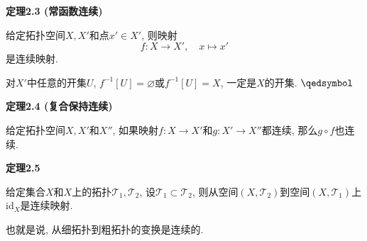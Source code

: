 \hypertarget{sec:定理2.3}{}
\noindent\textbf{定理2.3 (常函数连续)}

给定拓扑空间$X,X'$和点$x'\in X'$, 则映射
\[
    f:X\to X',\quad x\mapsto x'
\]
是连续映射.


对$X'$中任意的开集$U$, $f^{-1}[U]=\varnothing$或$f^{-1}[U]=X$, 一定是$X$的开集.
\hfill $\qedsymbol$

\vspace{10pt}

\hypertarget{sec:定理2.4}{}
\noindent\textbf{定理2.4 (复合保持连续)}

给定拓扑空间$X,X'$和$X''$,
如果映射$f:X\to X'$和$g:X'\to X''$都连续, 那么$g\circ f$也连续.

\vspace{10pt}

\hypertarget{sec:定理2.5}{}
\noindent\textbf{定理2.5}

给定集合$X$和$X$上的拓扑$\mathcal{T}_1,\mathcal{T}_2$,
设$\mathcal{T}_1\subset\mathcal{T}_2$,
则从空间$(X,\mathcal{T}_2)$到空间$(X,\mathcal{T}_1)$上$\mathrm{id}_X$是连续映射.

也就是说, 从细拓扑到粗拓扑的变换是连续的.


